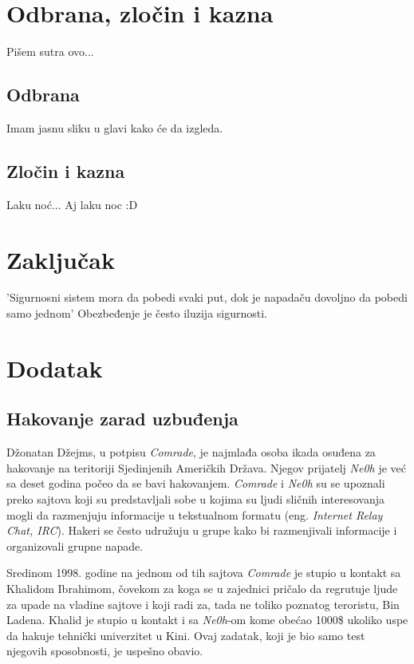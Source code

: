 \documentclass[a4paper]{article}
\begin{document}
\section{Odbrana, zločin i kazna}

Pišem sutra ovo...

\subsection{Odbrana}

Imam jasnu sliku u glavi kako će da izgleda.

\subsection{Zločin i kazna}

Laku noć...
Aj laku noc :D


\section{Zaključak}
\label{sec:zakljucak}

'Sigurnosni sistem mora da pobedi svaki put, dok je napadaču dovoljno da pobedi samo jednom' \cite{intrusion}
Obezbeđenje je često iluzija sigurnosti. \cite{deception}

\appendix
 


\appendix
\section{Dodatak}

\subsection{Hakovanje zarad uzbuđenja}
\label{mladi_hakeri}

Džonatan Džejms, u potpisu \textit{Comrade}, je najmlađa osoba ikada osuđena za hakovanje na teritoriji Sjedinjenih Američkih Država. Njegov prijatelj \textit{Ne0h} je već sa deset godina počeo da se bavi hakovanjem.  \textit{Comrade} i \textit{Ne0h} su se upoznali preko sajtova koji su predstavljali sobe u kojima su ljudi sličnih interesovanja mogli da razmenjuju informacije u tekstualnom formatu (eng. \textit{Internet Relay Chat, IRC}). Hakeri se često udružuju u grupe kako bi razmenjivali informacije i organizovali grupne napade.

Sredinom 1998. godine na jednom od tih sajtova \textit{Comrade} je stupio u kontakt sa Khalidom Ibrahimom, čovekom za koga se u zajednici pričalo da regrutuje ljude za upade na vladine sajtove i koji radi za, tada ne toliko poznatog teroristu, Bin Ladena. Khalid je stupio u kontakt i sa \textit{Ne0h}-om kome obećao 1000\$ ukoliko uspe da hakuje tehnički univerzitet u Kini. Ovaj zadatak, koji je bio samo test njegovih sposobnosti, je uspešno obavio.
\end{document}
